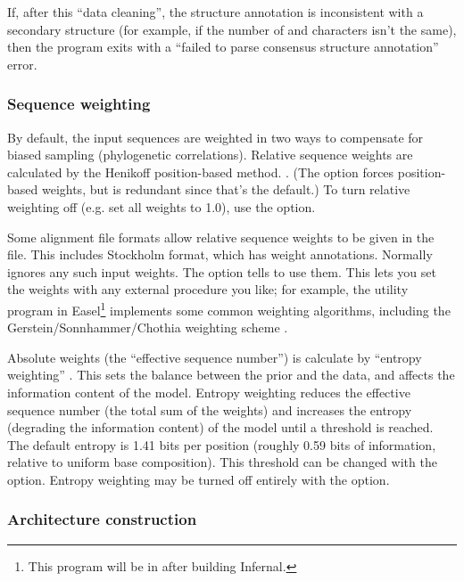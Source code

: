 If, after this ``data cleaning'', the structure annotation is
inconsistent with a secondary structure (for example, if the number of
\otext{<} and \otext{>} characters isn't the same), then the program
exits with a ``failed to parse consensus structure annotation'' error.

\subsubsection{Sequence weighting}

By default, the input sequences are weighted in two ways to compensate
for biased sampling (phylogenetic correlations).  Relative sequence
weights are calculated by the Henikoff position-based method.
\citep{Henikoff94b}.  (The  option forces position-based
weights, but is redundant since that's the default.)  To turn relative
weighting off (e.g. set all weights to 1.0), use the 
option.

Some alignment file formats allow relative sequence weights to be
given in the file. This includes Stockholm format, which has
 weight annotations. Normally  ignores any
such input weights.  The  option tells 
to use them.  This lets you set the weights with any external
procedure you like; for example, the  utility program in
Easel\footnote{This program will be in
   after building Infernal.} 
implements some common weighting algorithms,
including the Gerstein/Sonnhammer/Chothia weighting scheme
\citep{Gerstein94}.

Absolute weights (the ``effective sequence number'') is calculate by
``entropy weighting'' \citep{Karplus98}. This sets the balance between
the prior and the data, and affects the information content of the
model. Entropy weighting reduces the effective sequence number (the
total sum of the weights) and increases the entropy (degrading the
information content) of the model until a threshold is reached. The
default entropy is 1.41 bits per position (roughly 0.59 bits of
information, relative to uniform base composition). This threshold can
be changed with the  option. Entropy weighting may
be turned off entirely with the  option.


\subsubsection{Architecture construction}


